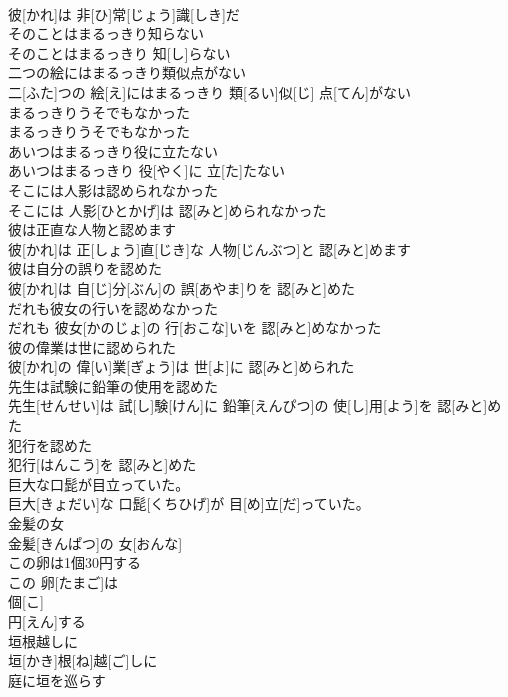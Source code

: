 \documentclass[8pt]{extreport}
\begin{document}
\begin{CJK}{UTF8}{min}
\\	彼[かれ]は 非[ひ]常[じょう]識[しき]だ
\\	そのことはまるっきり知らない	
\\	そのことはまるっきり 知[し]らない
\\	二つの絵にはまるっきり類似点がない	
\\	二[ふた]つの 絵[え]にはまるっきり 類[るい]似[じ] 点[てん]がない
\\	まるっきりうそでもなかった	
\\	まるっきりうそでもなかった
\\	あいつはまるっきり役に立たない	
\\	あいつはまるっきり 役[やく]に 立[た]たない
\\	そこには人影は認められなかった	
\\	そこには 人影[ひとかげ]は 認[みと]められなかった
\\	彼は正直な人物と認めます	
\\	彼[かれ]は 正[しょう]直[じき]な 人物[じんぶつ]と 認[みと]めます
\\	彼は自分の誤りを認めた	
\\	彼[かれ]は 自[じ]分[ぶん]の 誤[あやま]りを 認[みと]めた
\\	だれも彼女の行いを認めなかった	
\\	だれも 彼女[かのじょ]の 行[おこな]いを 認[みと]めなかった
\\	彼の偉業は世に認められた	
\\	彼[かれ]の 偉[い]業[ぎょう]は 世[よ]に 認[みと]められた
\\	先生は試験に鉛筆の使用を認めた	
\\	先生[せんせい]は 試[し]験[けん]に 鉛筆[えんぴつ]の 使[し]用[よう]を 認[みと]めた
\\	犯行を認めた	
\\	犯行[はんこう]を 認[みと]めた
\\	巨大な口髭が目立っていた。	
\\	巨大[きょだい]な 口髭[くちひげ]が 目[め]立[だ]っていた。
\\	金髪の女	
\\	金髪[きんぱつ]の 女[おんな]
\\	この卵は1個30円する	
\\	この 卵[たまご]は 
\\	個[こ] 
\\	円[えん]する
\\	垣根越しに	
\\	垣[かき]根[ね]越[ご]しに
\\	庭に垣を巡らす	

\end{CJK}
\end{document}
